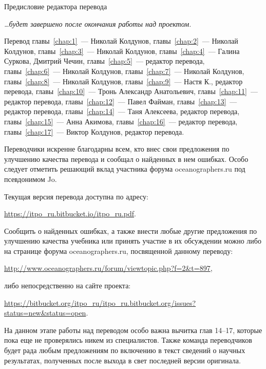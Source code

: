 
\begin{chapter}{Предисловие редактора перевода}

\textit{\dots{}будет завершено после окончания работы над проектом.}

\bigskip 

Перевод главы~\ref{chap:1}~--- Николай Колдунов, 
главы~\ref{chap:2}~--- Николай Колдунов,
главы~\ref{chap:3}~--- Николай Колдунов, 
главы~\ref{chap:4}~--- Галина Суркова, Дмитрий Чечин, 
главы~\ref{chap:5}~--- редактор перевода, 
главы~\ref{chap:6}~--- Николай Колдунов, 
главы~\ref{chap:7}~--- Николай Колдунов,
главы~\ref{chap:8}~--- Николай Колдунов,
главы~\ref{chap:9}~--- Настя К., редактор перевода,
главы~\ref{chap:10}~--- Тронь Александр Анатольевич,
главы~\ref{chap:11}~--- редактор перевода,
главы~\ref{chap:12}~--- Павел Файман,
главы~\ref{chap:13}~--- редактор перевода,
главы~\ref{chap:14}~--- Таня Алексеева, редактор перевода,
главы~\ref{chap:15}~--- Анна Акимова,
главы~\ref{chap:16}~--- редактор перевода,
главы~\ref{chap:17}~--- Виктор Колдунов, редактор перевода.

Переводчики искренне благодарны всем, кто внес свои предложения по
улучшению качества перевода и сообщал о найденных в нем ошибках. Особо
следует отметить решающий вклад участника форума oceanographers.ru под
псевдонимом Jo.

Текущая версия перевода доступна по адресу:
\begin{center}
\href{https://itpo_ru.bitbucket.io/itpo_ru.pdf}%
{\url{https://itpo_ru.bitbucket.io/itpo_ru.pdf}}. 
\end{center}

Сообщить о найденных ошибках, а также внести любые другие предложения
по улучшению качества учебника или принять участие в их обсуждении
можно либо на странице форума oceanographers.ru, посвященной данному
переводу:
\begin{center}
 \href{http://www.oceanographers.ru/forum/viewtopic.php?f=2&t=897}%
{\url{http://www.oceanographers.ru/forum/viewtopic.php?f=2&t=897}},
\end{center}
либо непосредственно на сайте проекта:
\begin{center}
\href{https://bitbucket.org/itpo_ru/itpo_ru.bitbucket.org/issues?status=new&status=open}%
{\url{https://bitbucket.org/itpo_ru/itpo_ru.bitbucket.org/issues?status=new&status=open}}.
\end{center}

На данном этапе работы над переводом особо важна вычитка глав 14--17,
которые пока еще не проверялись никем из специалистов. Также команда
переводчиков будет рада любым предложениям по включению в текст
сведений о научных результатах, полученных после выхода в свет
последней версии оригинала.
\end{chapter}

